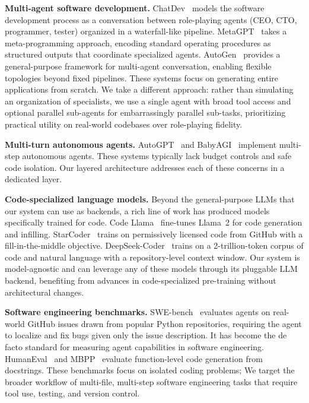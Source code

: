 \documentclass{article}
\begin{document}
\textbf{Multi-agent software development.}
ChatDev~\citep{qian2024chatdev} models the software development
process as a conversation between role-playing agents (CEO, CTO,
programmer, tester) organized in a waterfall-like pipeline.
MetaGPT~\citep{hong2024metagpt} takes a meta-programming approach,
encoding standard operating procedures as structured outputs that
coordinate specialized agents.
AutoGen~\citep{wu2023autogen} provides a general-purpose framework
for multi-agent conversation, enabling flexible topologies beyond
fixed pipelines.  These systems focus on generating entire
applications from scratch.  We take a different approach: rather than
simulating an organization of specialists, we use a
single agent with broad tool access and optional parallel sub-agents
for embarrassingly parallel sub-tasks, prioritizing practical utility
on real-world codebases over role-playing fidelity.

\textbf{Multi-turn autonomous agents.}
AutoGPT~\citep{autogpt2023} and BabyAGI~\citep{babyagi2023} implement
multi-step autonomous agents.  These systems typically lack budget
controls and safe code isolation.  Our layered architecture addresses
each of these concerns in a dedicated layer.

\textbf{Code-specialized language models.}
Beyond the general-purpose LLMs that our system can use as backends,
a rich line of work has produced models specifically trained for code.
Code Llama~\citep{roziere2023code} fine-tunes Llama~2 for code
generation and infilling.
StarCoder~\citep{li2023starcoder} trains on permissively licensed code
from GitHub with a fill-in-the-middle objective.
DeepSeek-Coder~\citep{guo2024deepseek} trains on a 2-trillion-token
corpus of code and natural language with a repository-level
context window.  Our system is model-agnostic and can leverage any of
these models through its pluggable LLM backend, benefiting from
advances in code-specialized pre-training without architectural
changes.

\textbf{Software engineering benchmarks.}
SWE-bench~\citep{jimenez2024swebench} evaluates agents on
real-world GitHub issues drawn from popular Python repositories,
requiring the agent to localize and fix bugs given only the issue
description.  It has become the de facto standard for measuring agent
capabilities in software engineering.
HumanEval~\citep{chen2021evaluating} and
MBPP~\citep{austin2021program} evaluate function-level code generation
from docstrings.  These benchmarks focus on isolated coding problems;
We target the broader workflow of multi-file, multi-step
software engineering tasks that require tool use, testing, and version
control.
\end{document}
